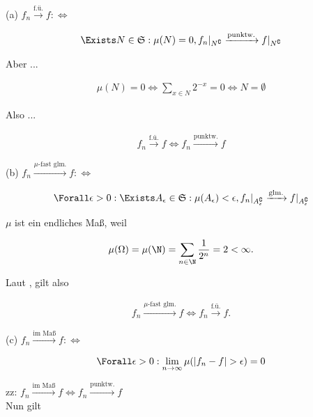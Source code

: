 \begin{solution}

(a) $f_n \xrightarrow{\text{f.ü.}} f : \Leftrightarrow$

\begin{align*}
  \Exists N \in \mathfrak{S}:
  \mu(N) = 0,
  f_n|_{N^\complement} \xrightarrow{\text{punktw.}} f|_{N^\complement}
\end{align*}

Aber ...

\begin{align*}
  \mu(N) = 0
  \Leftrightarrow
  \sum_{x \in N} 2^{-x} = 0
  \Leftrightarrow
  N = \emptyset
\end{align*}

Also ...

\begin{align*}
  f_n \xrightarrow{\text{f.ü.}} f
  \Leftrightarrow
  f_n \xrightarrow{\text{punktw.}} f
\end{align*}

(b) $f_n \xrightarrow{\mu \text{-fast glm.}} f : \Leftrightarrow$

\begin{align*}
  \Forall \epsilon > 0:
  \Exists A_\epsilon \in \mathfrak{S}:
  \mu(A_\epsilon) < \epsilon,
  f_n|_{A_\epsilon^\complement} \xrightarrow{\text{glm.}} f|_{A_\epsilon^\complement}
\end{align*}

$\mu$ ist ein endliches Maß, weil

\begin{align*}
  \mu(\Omega) = \mu(\N) = \sum_{n \in \N} \frac{1}{2^n} = 2 < \infty.
\end{align*}

Laut , gilt also

\begin{align*}
  f_n \xrightarrow{\mu \text{-fast glm.}} f
  \Leftrightarrow
  f_n \xrightarrow{\text{f.ü.}} f.
\end{align*}

(c) $f_n \xrightarrow{\text{im Maß}} f : \Leftrightarrow$

\begin{align*}
  \Forall \epsilon > 0:
  \lim_{n \to \infty} \mu(|f_n - f| > \epsilon) = 0
\end{align*}

zz: $f_n \xrightarrow{\text{im Maß}} f \Leftrightarrow f_n \xrightarrow{\text{punktw.}} f$ \\

Nun gilt


\end{solution}
